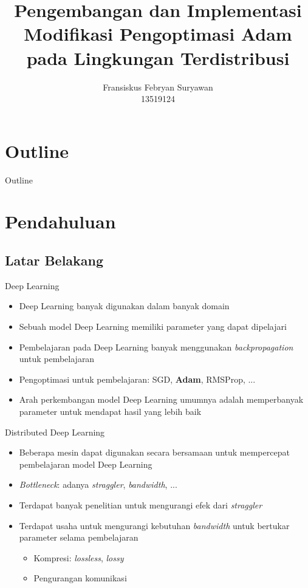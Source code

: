 \documentclass[aspectratio=169]{beamer}
\title[Modifikasi Adam]{Pengembangan dan Implementasi Modifikasi Pengoptimasi Adam pada Lingkungan Terdistribusi}
\author[]{
  Fransiskus Febryan Suryawan\\
  13519124
}
\institute{Institut Teknologi Bandung}
\date{}
\begin{document}
{
\makeatletter
\setlength{\hoffset}{-.5\beamer@sidebarwidth}
\makeatother
\begin{frame}[plain]
  \titlepage
\end{frame}
}

\section*{Outline}
\begin{frame}{Outline}
  \begin{center}
    \tableofcontents
  \end{center}
\end{frame}

\section{Pendahuluan}
\subsection{Latar Belakang}
\begin{frame}{Deep Learning}
  \begin{itemize}
    \item Deep Learning banyak digunakan dalam banyak domain
    \item Sebuah model Deep Learning memiliki parameter yang dapat dipelajari
    \item Pembelajaran pada Deep Learning banyak menggunakan \textit{backpropagation} untuk pembelajaran
    \item Pengoptimasi untuk pembelajaran: SGD, \textbf{Adam}, RMSProp, ...
    \item Arah perkembangan model Deep Learning umumnya adalah memperbanyak parameter untuk mendapat hasil yang lebih baik
  \end{itemize}
\end{frame}

\begin{frame}{Distributed Deep Learning}
  \begin{itemize}
    \item Beberapa mesin dapat digunakan secara bersamaan untuk mempercepat pembelajaran model Deep Learning
    \item \textit{Bottleneck}: adanya \textit{straggler}, \textit{bandwidth}, ...
    \item Terdapat banyak penelitian untuk mengurangi efek dari \textit{straggler}
    \item Terdapat usaha untuk mengurangi kebutuhan \textit{bandwidth} untuk bertukar parameter selama pembelajaran
          \begin{itemize}
            \item Kompresi: \textit{lossless}, \textit{lossy}
            \item Pengurangan komunikasi
          \end{itemize}
  \end{itemize}
\end{frame}
\end{document}
